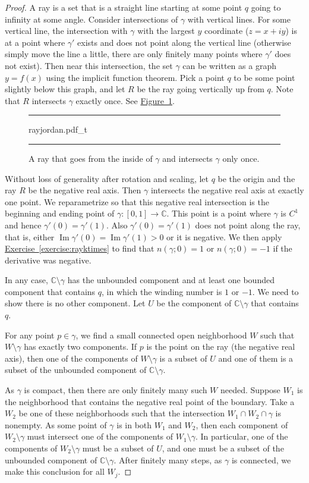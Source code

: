 \documentclass[12pt,openany]{book}
\renewcommand{\Im}{\operatorname{Im}}
\newcommand{\C}{{\mathbb{C}}}
\theoremstyle{plain}
\theoremstyle{remark}
\theoremstyle{definition}
\newenvironment{myfig}{%
\begin{figure}[h!t]
\noindent\rule{\textwidth}{0.5pt}\vspace{12pt}\par\centering}%
{\par\noindent\rule{\textwidth}{0.5pt}
\end{figure}}
\theoremstyle{exercise}
\theoremstyle{example}
\newcommand{\figureref}[1]{\hyperref[#1]{Figure~\ref*{#1}}}
\newcommand{\exerciseref}[1]{\hyperref[#1]{Exercise~\ref*{#1}}}
\begin{document}
\begin{proof}
A ray is a set that is a straight line starting at some point $q$
going to infinity at some angle.
Consider
intersections of $\gamma$ with vertical lines.  For some vertical line,
the intersection with $\gamma$ with the largest $y$ coordinate ($z=x+iy$)
is at a point where $\gamma'$ exists and does not point along the vertical line (otherwise
simply move the line a little, there are only finitely many points where
$\gamma'$ does not exist).  Then near this intersection, the set $\gamma$
can be written as a graph $y=f(x)$ using the implicit function theorem.
Pick a point $q$ to be some point slightly below this graph, and let $R$ be the
ray going vertically up from $q$.  Note that $R$ intersects $\gamma$ exactly
once.
See \figureref{fig:rayjordan}.
\begin{myfig}
{rayjordan.pdf_t}
\caption{A ray that goes from the inside of $\gamma$ and intersects $\gamma$
only once.\label{fig:rayjordan}}
\end{myfig}

Without loss of generality after rotation and scaling, let $q$ be the origin and
the ray $R$ be the negative real axis.  Then $\gamma$ intersects the negative
real axis at exactly one point.
We reparametrize so that this negative real intersection
is the beginning and ending point of $\gamma \colon [0,1] \to \C$.  This
point is a point where $\gamma$ is $C^1$ and hence $\gamma'(0) =
\gamma'(1)$.  Also $\gamma'(0) = \gamma'(1)$ does not point along the ray,
that is, either $\Im \gamma'(0) = \Im \gamma'(1) > 0$ or it is negative.
We then apply
\exerciseref{exercise:rayktimes} to find that $n(\gamma;0) = 1$ or
$n(\gamma;0) = -1$ if the derivative was negative.

In any case, $\C \setminus \gamma$ has the unbounded component
and at least one bounded component that contains $q$,
in which the winding number is $1$ or $-1$.  We
need to show there is no other component.  Let $U$ be the component of $\C
\setminus \gamma$ that contains $q$.

For any point $p \in \gamma$, we find a small connected open neighborhood
$W$ such that $W \setminus \gamma$ has exactly two components.
If $p$ is the point on the ray (the negative real axis), then one of the
components of $W \setminus \gamma$ is a subset of $U$ and one of them is a
subset of the unbounded component of $\C \setminus \gamma$.

As $\gamma$ is compact, then there are only finitely many such $W$ needed.
Suppose $W_1$ is the neighborhood that contains the negative real point of
the boundary.  Take a $W_2$ be one of these neighborhoods such that the
intersection $W_1 \cap W_2 \cap \gamma$ is nonempty.  As some point of $\gamma$ is
in both $W_1$ and $W_2$, then each component of $W_2 \setminus \gamma$
must intersect one of the components of $W_1 \setminus \gamma$.  In
particular,
one of the components of $W_2 \setminus \gamma$ must be a subset of $U$,
and one must be a subset of the unbounded component of $\C \setminus
\gamma$.  After finitely many steps, as $\gamma$ is connected, we make this
conclusion for all $W_j$.


\end{proof}
\end{document}
